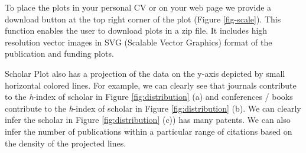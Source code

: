 To place the plots in your personal CV or on your web page we provide a download button at the top right corner of the plot (Figure \ref{fig-scale}). This function enables the user to download plots in a zip file. It includes high resolution vector images in SVG (Scalable Vector Graphics) format of the publication and funding plots.

Scholar Plot also has a projection of the data on the y-axis depicted by small horizontal colored lines. For example, we can clearly see that journals contribute to the {\it h}-index of scholar in Figure \ref{fig:distribution} (a) and conferences / books contribute to the {\it h}-index of scholar in Figure \ref{fig:distribution} (b). We can clearly infer the scholar in Figure \ref{fig:distribution} (c)) has many patents. We can also infer the number of publications within a particular range of citations based on the density of the projected lines.

